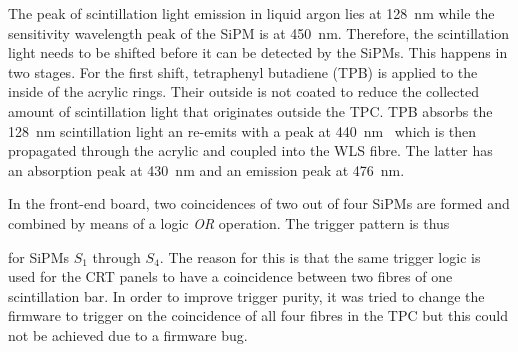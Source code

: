 The peak of scintillation light emission in liquid argon lies at \SI{128}{\nano\metre} while the sensitivity wavelength peak of the SiPM is at \SI{450}{\nano\metre}.
Therefore, the scintillation light needs to be shifted before it can be detected by the SiPMs.
This happens in two stages.
For the first shift, tetraphenyl butadiene (TPB) is applied to the inside of the acrylic rings.
Their outside is not coated to reduce the collected amount of scintillation light that originates outside the TPC.
TPB absorbs the \SI{128}{\nano\metre} scintillation light an re-emits with a peak at \SI{440}{\nano\metre}~\cite{tpb} which is then propagated through the acrylic and coupled into the WLS fibre.
The latter has an absorption peak at \SI{430}{\nano\metre} and an emission peak at \SI{476}{\nano\metre}.

In the front-end board, two coincidences of two out of four SiPMs are formed and combined by means of a logic \emph{OR} operation.
The trigger pattern is thus


for SiPMs $S_1$ through $S_4$.
The reason for this is that the same trigger logic is used for the CRT panels to have a coincidence between two fibres of one scintillation bar.
In order to improve trigger purity, it was tried to change the firmware to trigger on the coincidence of all four fibres in the TPC but this could not be achieved due to a firmware bug.